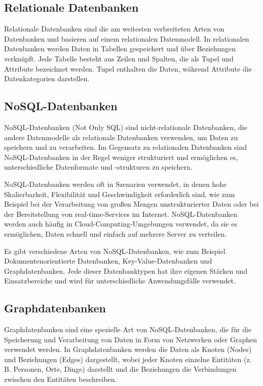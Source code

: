 \subsection{Relationale Datenbanken}
Relationale Datenbanken sind die am weitesten verbreiteten Arten von Datenbanken und basieren auf einem relationalen Datenmodell. In relationalen Datenbanken werden Daten in Tabellen gespeichert und über Beziehungen verknüpft. Jede Tabelle besteht aus Zeilen und Spalten, die als Tupel und Attribute bezeichnet werden. Tupel enthalten die Daten, während Attribute die Datenkategorien darstellen.


\subsection{NoSQL-Datenbanken}
NoSQL-Datenbanken (Not Only SQL) sind nicht-relationale Datenbanken, die andere Datenmodelle als relationale Datenbanken verwenden, um Daten zu speichern und zu verarbeiten. Im Gegensatz zu relationalen Datenbanken sind NoSQL-Datenbanken in der Regel weniger strukturiert und ermöglichen es, unterschiedliche Datenformate und -strukturen zu speichern.

NoSQL-Datenbanken werden oft in Szenarien verwendet, in denen hohe Skalierbarkeit, Flexibilität und Geschwindigkeit erforderlich sind, wie zum Beispiel bei der Verarbeitung von großen Mengen unstrukturierter Daten oder bei der Bereitstellung von real-time-Services im Internet. NoSQL-Datenbanken werden auch häufig in Cloud-Computing-Umgebungen verwendet, da sie es ermöglichen, Daten schnell und einfach auf mehrere Server zu verteilen.

Es gibt verschiedene Arten von NoSQL-Datenbanken, wie zum Beispiel Dokumentenorientierte Datenbanken, Key-Value-Datenbanken und Graphdatenbanken. Jede dieser Datenbanktypen hat ihre eigenen Stärken und Einsatzbereiche und wird für unterschiedliche Anwendungsfälle verwendet.





\subsection{Graphdatenbanken}
Graphdatenbanken sind eine spezielle Art von NoSQL-Datenbanken, die für die Speicherung und Verarbeitung von Daten in Form von Netzwerken oder Graphen verwendet werden. In Graphdatenbanken werden die Daten als Knoten (Nodes) und Beziehungen (Edges) dargestellt, wobei jeder Knoten einzelne Entitäten (z. B. Personen, Orte, Dinge) darstellt und die Beziehungen die Verbindungen zwischen den Entitäten beschreiben.

